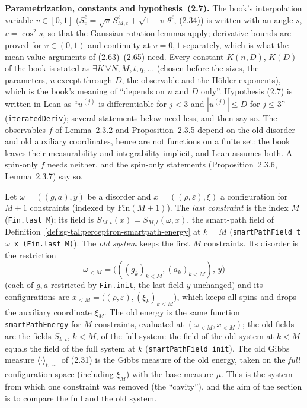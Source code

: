 \medskip\noindent\textbf{Parametrization, constants and hypothesis~(2.7).} The book's interpolation variable $v\in[0,1]$
($S_v^\ell=\sqrt v\,S_{M,t}^\ell+\sqrt{1-v}\,\theta^\ell$, (2.34)) is written with an angle $s$, $v=\cos^2 s$, so that the Gaussian
rotation lemmas apply; derivative bounds are proved for $v\in(0,1)$ and continuity at $v=0,1$ separately, which is what the
mean-value arguments of (2.63)--(2.65) need. Every constant $K(n,D)$, $K(D)$ of the book is stated as
$\exists K\,\forall N,M,t,q,\dots$ (chosen before the sizes, the parameters, $u$ except through $D$, the observable and the H\"older
exponents), which is the book's meaning of ``depends on $n$ and $D$ only''. Hypothesis (2.7) is written in Lean as
``$u^{(j)}$ is differentiable for $j<3$ and $|u^{(j)}|\le D$ for $j\le3$'' (\texttt{iteratedDeriv}); several statements below need
less, and then say so. The observables $f$ of Lemma~2.3.2 and Proposition~2.3.5 depend on the old disorder and old auxiliary
coordinates, hence are not functions on a finite set: the book leaves their measurability and integrability implicit, and Lean
assumes both. A spin-only $f$ needs neither, and the spin-only statements (Proposition~2.3.6, Lemma~2.3.7) say so.

\begin{definition}\label{def:sg-tal:perceptron-cavity-old-system}
  \leanok
Let $\omega=((g,a),y)$ be a disorder and $x=((\rho,\varepsilon),\xi)$ a configuration for $M+1$ constraints (indexed by
$\mathrm{Fin}(M+1)$). The \emph{last constraint} is the index $M$ (\texttt{Fin.last M}); its field is
$S_{M,t}(x)=S_{M,t}(\omega,x)$, the smart-path field of Definition~\ref{def:sg-tal:perceptron-smartpath-energy} at $k=M$
(\texttt{smartPathField t $\omega$ x (Fin.last M)}). The \emph{old system} keeps the first $M$ constraints. Its disorder is the
restriction
\[
 \omega_{<M}=\bigl(((g_k)_{k<M},(a_k)_{k<M}),\,y\bigr)
\]
(each of $g,a$ restricted by \texttt{Fin.init}, the last field $y$ unchanged) and its configurations are
$x_{<M}=\bigl((\rho,\varepsilon),(\xi_k)_{k<M}\bigr)$, which keeps all spins and drops the auxiliary coordinate $\xi_M$. The old
energy is the same function \texttt{smartPathEnergy} for $M$ constraints, evaluated at $(\omega_{<M},x_{<M})$; the old fields
are the fields $S_{k,t}$, $k<M$, of the full system: the field of the old system at $k<M$ equals the field of the full system
at $k$ (\texttt{smartPathField\_init}). The old Gibbs measure $\langle\cdot\rangle_{t,\sim}$ of (2.31) is the Gibbs measure of the
old energy, taken on the \emph{full} configuration space (including $\xi_M$) with the base measure $\mu$. This is the system from
which one constraint was removed (the ``cavity''), and the aim of the section is to compare the full and the old system.
\end{definition}

